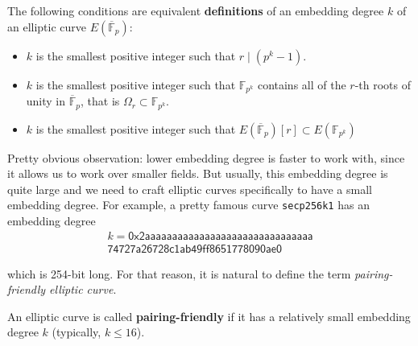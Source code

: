 \documentclass[../lecture-notes.tex]{subfiles}
\begin{document}
\begin{definition}
    The following conditions are equivalent \textbf{definitions} of an embedding degree $k$ of an elliptic curve $E(\overline{\mathbb{F}}_p)$:
    \begin{itemize}
        \item $k$ is the smallest positive integer such that $r \mid (p^k-1)$.
        \item $k$ is the smallest positive integer such that $\mathbb{F}_{p^k}$ contains all of the $r$-th roots of unity in $\overline{\mathbb{F}}_p$, that is $\Omega_r \subset \mathbb{F}_{p^k}$.
        \item $k$ is the smallest positive integer such that $E(\overline{\mathbb{F}}_p)[r] \subset E(\mathbb{F}_{p^k})$
    \end{itemize}
\end{definition}

Pretty obvious observation: lower embedding degree is faster to work with, since it allows us to work over smaller fields. But usually, this embedding degree is quite large and we need to craft elliptic curves specifically to have a small embedding degree. For example, a pretty famous curve \texttt{secp256k1} has an embedding degree
\begin{equation*}
    \begin{aligned}    
    k = \mathsf{0x2aaaaaaaaaaaaaaaaaaaaaaaaaaaaaaa} \\
    \mathsf{74727a26728c1ab49ff8651778090ae0}
    \end{aligned}
\end{equation*}

\vspace{-1mm}

which is 254-bit long. For that reason, it is natural to define the term \textit{pairing-friendly elliptic curve}.

\vspace{-1mm}

\begin{definition}
    An elliptic curve is called \textbf{pairing-friendly} if it has a relatively small embedding degree $k$ (typically, $k \leq 16$).
\end{definition}
\end{document}
